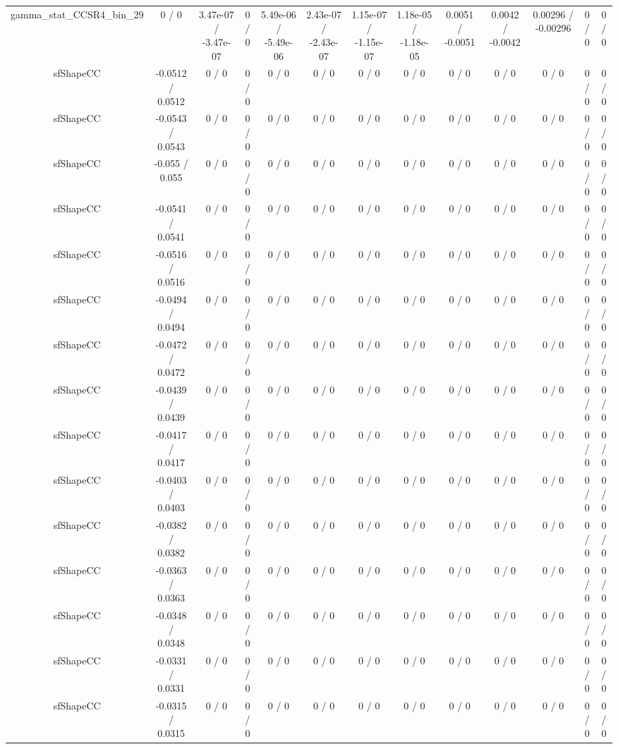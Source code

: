 \documentclass[10pt]{article}
\begin{document}
\begin{table}[htbp]
\begin{center}
\begin{tabular}{|c|c|c|c|c|c|c|c|c|c|c|c|c|}
  gamma_stat_CCSR4_bin_29 & 0 / 0 & 3.47e-07 / -3.47e-07 & 0 / 0 & 5.49e-06 / -5.49e-06 & 2.43e-07 / -2.43e-07 & 1.15e-07 / -1.15e-07 & 1.18e-05 / -1.18e-05 & 0.0051 / -0.0051 & 0.0042 / -0.0042 & 0.00296 / -0.00296 & 0 / 0 & 0 / 0 \\ 
  sfShapeCC & -0.0512 / 0.0512 & 0 / 0 & 0 / 0 & 0 / 0 & 0 / 0 & 0 / 0 & 0 / 0 & 0 / 0 & 0 / 0 & 0 / 0 & 0 / 0 & 0 / 0 \\ 
  sfShapeCC & -0.0543 / 0.0543 & 0 / 0 & 0 / 0 & 0 / 0 & 0 / 0 & 0 / 0 & 0 / 0 & 0 / 0 & 0 / 0 & 0 / 0 & 0 / 0 & 0 / 0 \\ 
  sfShapeCC & -0.055 / 0.055 & 0 / 0 & 0 / 0 & 0 / 0 & 0 / 0 & 0 / 0 & 0 / 0 & 0 / 0 & 0 / 0 & 0 / 0 & 0 / 0 & 0 / 0 \\ 
  sfShapeCC & -0.0541 / 0.0541 & 0 / 0 & 0 / 0 & 0 / 0 & 0 / 0 & 0 / 0 & 0 / 0 & 0 / 0 & 0 / 0 & 0 / 0 & 0 / 0 & 0 / 0 \\ 
  sfShapeCC & -0.0516 / 0.0516 & 0 / 0 & 0 / 0 & 0 / 0 & 0 / 0 & 0 / 0 & 0 / 0 & 0 / 0 & 0 / 0 & 0 / 0 & 0 / 0 & 0 / 0 \\ 
  sfShapeCC & -0.0494 / 0.0494 & 0 / 0 & 0 / 0 & 0 / 0 & 0 / 0 & 0 / 0 & 0 / 0 & 0 / 0 & 0 / 0 & 0 / 0 & 0 / 0 & 0 / 0 \\ 
  sfShapeCC & -0.0472 / 0.0472 & 0 / 0 & 0 / 0 & 0 / 0 & 0 / 0 & 0 / 0 & 0 / 0 & 0 / 0 & 0 / 0 & 0 / 0 & 0 / 0 & 0 / 0 \\ 
  sfShapeCC & -0.0439 / 0.0439 & 0 / 0 & 0 / 0 & 0 / 0 & 0 / 0 & 0 / 0 & 0 / 0 & 0 / 0 & 0 / 0 & 0 / 0 & 0 / 0 & 0 / 0 \\ 
  sfShapeCC & -0.0417 / 0.0417 & 0 / 0 & 0 / 0 & 0 / 0 & 0 / 0 & 0 / 0 & 0 / 0 & 0 / 0 & 0 / 0 & 0 / 0 & 0 / 0 & 0 / 0 \\ 
  sfShapeCC & -0.0403 / 0.0403 & 0 / 0 & 0 / 0 & 0 / 0 & 0 / 0 & 0 / 0 & 0 / 0 & 0 / 0 & 0 / 0 & 0 / 0 & 0 / 0 & 0 / 0 \\ 
  sfShapeCC & -0.0382 / 0.0382 & 0 / 0 & 0 / 0 & 0 / 0 & 0 / 0 & 0 / 0 & 0 / 0 & 0 / 0 & 0 / 0 & 0 / 0 & 0 / 0 & 0 / 0 \\ 
  sfShapeCC & -0.0363 / 0.0363 & 0 / 0 & 0 / 0 & 0 / 0 & 0 / 0 & 0 / 0 & 0 / 0 & 0 / 0 & 0 / 0 & 0 / 0 & 0 / 0 & 0 / 0 \\ 
  sfShapeCC & -0.0348 / 0.0348 & 0 / 0 & 0 / 0 & 0 / 0 & 0 / 0 & 0 / 0 & 0 / 0 & 0 / 0 & 0 / 0 & 0 / 0 & 0 / 0 & 0 / 0 \\ 
  sfShapeCC & -0.0331 / 0.0331 & 0 / 0 & 0 / 0 & 0 / 0 & 0 / 0 & 0 / 0 & 0 / 0 & 0 / 0 & 0 / 0 & 0 / 0 & 0 / 0 & 0 / 0 \\ 
  sfShapeCC & -0.0315 / 0.0315 & 0 / 0 & 0 / 0 & 0 / 0 & 0 / 0 & 0 / 0 & 0 / 0 & 0 / 0 & 0 / 0 & 0 / 0 & 0 / 0 & 0 / 0 \\ 

\end{tabular}
\end{center}
\end{table}
\end{document}
